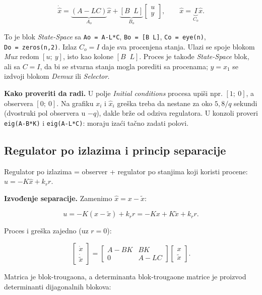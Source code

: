 \documentclass[11pt,a4paper,parskip=half,headsepline,numbers=noenddot]{scrartcl}
\begin{document}
\[\dot{\hat x} = \underbrace{(A - LC)}_{A_o}\hat x + \underbrace{[B\;\; L]}_{B_o}\begin{bmatrix}u\\ y\end{bmatrix},\qquad \hat x = \underbrace{I}_{C_o}\hat x .\]

To je blok \emph{State-Space} sa \texttt{Ao\ =\ A-L*C}, \texttt{Bo\ =\ {[}B\ L{]}}, \texttt{Co\ =\ eye(\allowbreak{}n)}, \texttt{Do\ =\ zeros(\allowbreak{}n,\allowbreak{}2)}. Izlaz \(C_o = I\) daje sva procenjena stanja. Ulazi se spoje blokom \emph{Mux} redom \([u;\ y]\), isto kao kolone \([B\;\; L]\). Proces je takođe \emph{State-Space} blok, ali sa \(C = I\), da bi se stvarna stanja mogla porediti sa procenama; \(y = x_1\) se izdvoji blokom \emph{Demux} ili \emph{Selector}.

\textbf{Kako proveriti da radi.} U polje \emph{Initial conditions} procesa upiši npr. \([1;\ 0]\), a observera \([0;\ 0]\). Na grafiku \(x_i\) i \(\hat x_i\) greška treba da nestane za oko \(5{,}8/q\) sekundi (dvostruki pol observera u \(-q\)), dakle brže od odziva regulatora. U konzoli proveri \texttt{eig(\allowbreak{}A-B*K)} i \texttt{eig(\allowbreak{}A-L*C)}: moraju izaći tačno zadati polovi.

\subsection{Regulator po izlazima i princip separacije}

Regulator po izlazima = observer + regulator po stanjima koji koristi procene: \(u = -K\hat x + k_r r\).

\textbf{Izvođenje separacije.} Zamenimo \(\hat x = x - \tilde x\):

\[u = -K(x - \tilde x) + k_r r = -Kx + K\tilde x + k_r r .\]

Proces i greška zajedno (uz \(r = 0\)):

\[\begin{bmatrix}\dot x\\ \dot{\tilde x}\end{bmatrix} = \begin{bmatrix}A - BK & BK\\ 0 & A - LC\end{bmatrix}\begin{bmatrix}x\\ \tilde x\end{bmatrix}.\]

Matrica je blok-trougaona, a determinanta blok-trougaone matrice je proizvod determinanti dijagonalnih blokova:
\end{document}
